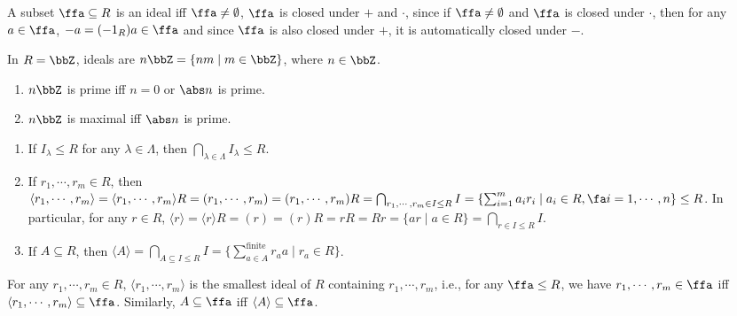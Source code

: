 \begin{remark}
    A subset $\ffa \subseteq R$ is an ideal iff $\ffa \neq \emptyset$, $\ffa$ is closed under $+$ and $\cdot$, since if $\ffa \neq \emptyset$ and $\ffa$ is closed under $\cdot$, then for any $a \in \ffa$, $-a = (-1_R)a \in \ffa$ and since $\ffa$ is also closed under $+$, it is automatically closed under $-$.
\end{remark}

\begin{example}
    In $R = \bbZ$, ideals are $n\bbZ = \{nm \mid m \in \bbZ\}$, where $n \in \bbZ$.
    \begin{enumerate}[(1)]
        \item $n\bbZ$ is prime iff $n = 0$ or $\abs n$ is prime.
        \item $n\bbZ$ is maximal iff $\abs n$ is prime.
    \end{enumerate}
\end{example}

\begin{example}
    \begin{enumerate}[(1)]
        \item 
            If $I_\lambda \leq R$ for any $\lambda \in \Lambda$, then $\bigcap_{\lambda \in \Lambda} I_\lambda \leq R$.
        \item 
            If $r_1,\cdots,r_m \in R$, then $\langle r_1,\cdots,r_m \rangle = \langle r_1,\cdots,r_m \rangle R = (r_1,\cdots,r_m) = (r_1,\cdots,r_m)R = \bigcap_{r_1,\cdots,r_m \in I \leq R} I = \{\sum_{i=1}^m a_ir_i \mid a_i \in R,\fa i = 1,\cdots,n\} \leq R$. In particular, for any $r \in R$, $\langle r \rangle = \langle r \rangle R = (r) = (r)R = rR = Rr = \{ar \mid a \in R\} = \bigcap_{r \in I \leq R}I$.
        \item If $A \subseteq R$, then $\langle A \rangle = \bigcap_{A \subseteq I \leq R}I = \{\sum_{a \in A}^{\text{finite}} r_a a \mid r_a \in R\}$.
    \end{enumerate}
\end{example}

\begin{remark}[Fact]
    For any $r_1,\cdots,r_m \in R$, $\langle r_1,\cdots,r_m \rangle$ is the smallest ideal of $R$ containing $r_1,\cdots,r_m$, i.e., for any $\ffa \leq R$, we have $r_1,\cdots,r_m \in \ffa$ iff $\langle r_1,\cdots,r_m \rangle \subseteq \ffa$. Similarly, $A \subseteq \ffa$ iff $\langle A \rangle \subseteq \ffa$. 
\end{remark}


